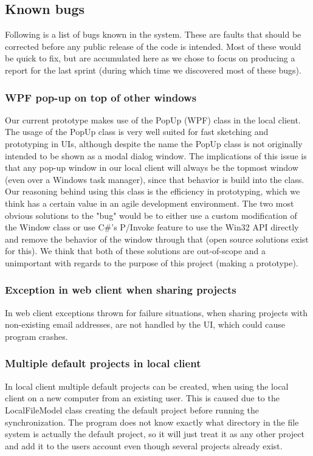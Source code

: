 \subsection{Known bugs}
\label{sec:bugs}

Following is a list of bugs known in the system. These are faults that should be corrected before any public
release of the code is intended. Most of these would be quick to fix, but are accumulated here as we chose
to focus on producing a report for the last sprint (during which time we discovered most of these bugs).

\subsubsection{WPF pop-up on top of other windows}
Our current prototype makes use of the PopUp (WPF) class in the local client. The usage of the PopUp class is very well suited for fast sketching and prototyping in UIs, although despite the name the PopUp class is not originally intended to be shown as a modal dialog window. The implications of this issue is that any pop-up window in our local client will always be the topmost window (even over a Windows task manager), since that behavior is build into the class. Our reasoning behind using this class is the efficiency in prototyping, which we think has a certain value in an agile development environment. The two most obvious solutions to the "bug" would be to either use a custom modification of the Window class or use C\#'s P/Invoke feature to use the Win32 API directly and remove the behavior of the window through that (open source solutions exist for this). We think that both of these solutions are out-of-scope and a unimportant with regards to the purpose of this project (making a prototype).

\subsubsection{Exception in web client when sharing projects}
In web client exceptions thrown for failure situations, when sharing projects with non-existing email addresses, are not handled by the UI, which could cause program crashes.

\subsubsection{Multiple default projects in local client}
In local client multiple default projects can be created, when using the local client on a new computer from an existing user. This is caused due to the LocalFileModel class creating the default project before running the synchronization. The program does not know exactly what directory in the file system is actually the default project, so it will just treat it as any other project and add it to the users account even though several projects already exist.


